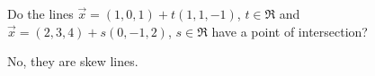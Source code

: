 
\begin{Exercise}[
name={},
title={}, 
difficulty=0,
origin={\cite{SM}}]
Do the lines $\vec{x} = (1,0,1) + t(1,1,-1)$, $t\in\Re$ and $\vec{x}=(2,3,4)+s(0,-1,2)$, $s\in\Re$ have a point of intersection?

\end{Exercise}

\begin{Answer}
No, they are skew lines.
\end{Answer}
